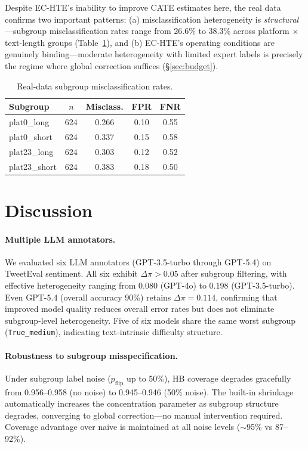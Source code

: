 \documentclass[11pt,a4paper]{article}
\newcommand{\DeltaPi}{\Delta\pi}
\begin{document}
Despite EC-HTE's inability to improve CATE estimates here, the real data confirms two important patterns: (a) misclassification heterogeneity is \emph{structural}---subgroup misclassification rates range from 26.6\% to 38.3\% across platform $\times$ text-length groups (Table~\ref{tab:realdata_subgroup}), and (b) EC-HTE's operating conditions are genuinely binding---moderate heterogeneity with limited expert labels is precisely the regime where global correction suffices (\S\ref{sec:budget}).

\begin{table}[t]
\centering
\small
\caption{Real-data subgroup misclassification rates.}
\label{tab:realdata_subgroup}
\begin{tabular}{@{}lcccc@{}}
\toprule
Subgroup & $n$ & Misclass. & FPR & FNR \\
\midrule
plat0\_long & 624 & 0.266 & 0.10 & 0.55 \\
plat0\_short & 624 & 0.337 & 0.15 & 0.58 \\
plat23\_long & 624 & 0.303 & 0.12 & 0.52 \\
plat23\_short & 624 & 0.383 & 0.18 & 0.50 \\
\bottomrule
\end{tabular}
\end{table}


\section{Discussion}

\paragraph{Multiple LLM annotators.}
We evaluated six LLM annotators (GPT-3.5-turbo through GPT-5.4) on TweetEval sentiment.
All six exhibit $\DeltaPi > 0.05$ after subgroup filtering, with effective heterogeneity ranging from 0.080 (GPT-4o) to 0.198 (GPT-3.5-turbo).
Even GPT-5.4 (overall accuracy 90\%) retains $\DeltaPi = 0.114$, confirming that improved model quality reduces overall error rates but does not eliminate subgroup-level heterogeneity.
Five of six models share the same worst subgroup (\texttt{True\_medium}), indicating text-intrinsic difficulty structure.

\paragraph{Robustness to subgroup misspecification.}
Under subgroup label noise ($p_{\text{flip}}$ up to 50\%), HB coverage degrades gracefully from 0.956--0.958 (no noise) to 0.945--0.946 (50\% noise).
The built-in shrinkage automatically increases the concentration parameter as subgroup structure degrades, converging to global correction---no manual intervention required.
Coverage advantage over naive is maintained at all noise levels ($\sim$95\% vs 87--92\%).
\end{document}
